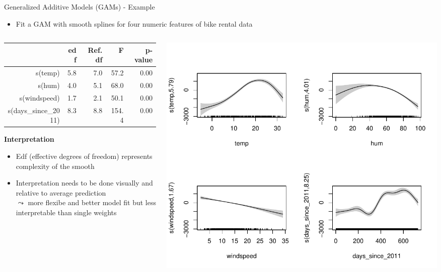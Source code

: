 \documentclass[11pt,compress,t,notes=noshow, aspectratio=169, xcolor=table]{beamer}
\begin{document}
\begin{frame}{Generalized Additive Models (GAMs) - Example}
    \begin{itemize}
    \item Fit a GAM with smooth splines for four numeric features of bike rental data 
\end{itemize}

\begin{columns}[T]
\begin{column}{0.45\textwidth}
\begin{table}[ht]
\centering
\tiny
\begin{tabular}{rrrrr}
  \hline
 & edf & Ref.df & F & p-value \\ 
  \hline
s(temp) & 5.8 & 7.0 & 57.2 & 0.00 \\ 
  s(hum) & 4.0 & 5.1 & 68.0 & 0.00 \\ 
  s(windspeed) & 1.7 & 2.1 & 50.1 & 0.00 \\ 
  s(days\_since\_2011) & 8.3 & 8.8 & 154.4 & 0.00 \\ 
   \hline
\end{tabular}
\end{table}


\textbf{Interpretation}
\begin{itemize}
    \item Edf (effective degrees of freedom) represents complexity of the smooth
    \item Interpretation needs to be done visually and relative to average prediction\\
    $\leadsto$ more flexibe and better model fit but less interpretable than single weights
\end{itemize}
\end{column}
\hfill
\begin{column}{0.5\textwidth}
\includegraphics[width = \textwidth]{figure/gam_effects.pdf}
\end{column}
\end{columns}
\end{frame}
\end{document}
